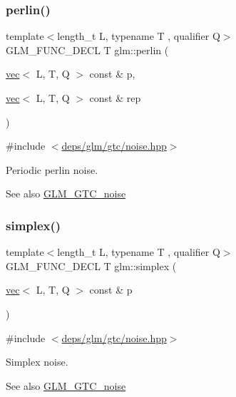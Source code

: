 \subsubsection{\texorpdfstring{perlin()}{perlin()}\hspace{0.1cm}{\footnotesize\ttfamily [2/2]}}
{\footnotesize\ttfamily template$<$length\+\_\+t L, typename T , qualifier Q$>$ \\
G\+L\+M\+\_\+\+F\+U\+N\+C\+\_\+\+D\+E\+CL T glm\+::perlin (\begin{DoxyParamCaption}\item[{\hyperlink{structglm_1_1vec}{vec}$<$ L, T, Q $>$ const \&}]{p,  }\item[{\hyperlink{structglm_1_1vec}{vec}$<$ L, T, Q $>$ const \&}]{rep }\end{DoxyParamCaption})}



{\ttfamily \#include $<$\hyperlink{noise_8hpp}{deps/glm/gtc/noise.\+hpp}$>$}

Periodic perlin noise. \begin{DoxySeeAlso}{See also}
\hyperlink{group__gtc__noise}{G\+L\+M\+\_\+\+G\+T\+C\+\_\+noise} 
\end{DoxySeeAlso}
\mbox{\label{group__gtc__noise_ga8122468c69015ff397349a7dcc638b27}} 
\subsubsection{\texorpdfstring{simplex()}{simplex()}}
{\footnotesize\ttfamily template$<$length\+\_\+t L, typename T , qualifier Q$>$ \\
G\+L\+M\+\_\+\+F\+U\+N\+C\+\_\+\+D\+E\+CL T glm\+::simplex (\begin{DoxyParamCaption}\item[{\hyperlink{structglm_1_1vec}{vec}$<$ L, T, Q $>$ const \&}]{p }\end{DoxyParamCaption})}



{\ttfamily \#include $<$\hyperlink{noise_8hpp}{deps/glm/gtc/noise.\+hpp}$>$}

Simplex noise. \begin{DoxySeeAlso}{See also}
\hyperlink{group__gtc__noise}{G\+L\+M\+\_\+\+G\+T\+C\+\_\+noise} 
\end{DoxySeeAlso}
